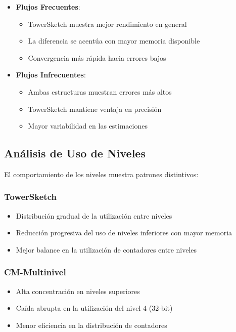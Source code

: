 \documentclass[a4paper,12pt]{article}
\begin{document}
\begin{itemize}
    \item \textbf{Flujos Frecuentes}:
    \begin{itemize}
        \item TowerSketch muestra mejor rendimiento en general
        \item La diferencia se acentúa con mayor memoria disponible
        \item Convergencia más rápida hacia errores bajos
    \end{itemize}
    
    \item \textbf{Flujos Infrecuentes}:
    \begin{itemize}
        \item Ambas estructuras muestran errores más altos
        \item TowerSketch mantiene ventaja en precisión
        \item Mayor variabilidad en las estimaciones
    \end{itemize}
\end{itemize}

\subsection{Análisis de Uso de Niveles}
El comportamiento de los niveles muestra patrones distintivos:

\subsubsection{TowerSketch}
\begin{itemize}
    \item Distribución gradual de la utilización entre niveles
    \item Reducción progresiva del uso de niveles inferiores con mayor memoria
    \item Mejor balance en la utilización de contadores entre niveles
\end{itemize}

\subsubsection{CM-Multinivel}
\begin{itemize}
    \item Alta concentración en niveles superiores
    \item Caída abrupta en la utilización del nivel 4 (32-bit)
    \item Menor eficiencia en la distribución de contadores
\end{itemize}
\end{document}
